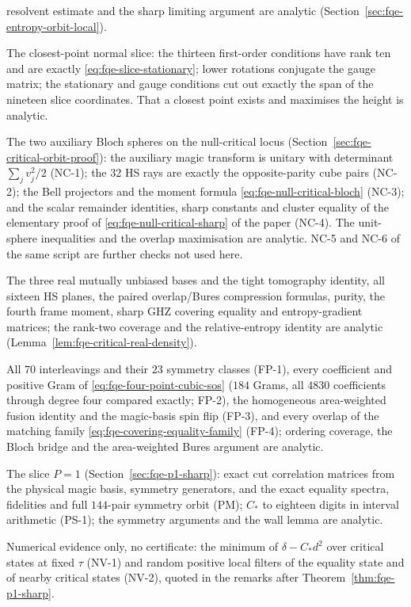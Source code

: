 \begin{description}
resolvent estimate and the sharp limiting argument are analytic
(Section~\ref{sec:fqe-entropy-orbit-local}).
\item[NSL-1--NSL-3] The closest-point normal slice: the thirteen first-order conditions have rank ten and are
exactly \eqref{eq:fqe-slice-stationary}; lower rotations conjugate the gauge matrix; the stationary and gauge
conditions cut out exactly the span of the nineteen slice coordinates. That a closest point exists and
maximises the height is analytic.
\item[NC-1--NC-4] The two auxiliary Bloch spheres on the null-critical locus
(Section~\ref{sec:fqe-critical-orbit-proof}): the auxiliary magic transform is unitary with determinant
$\sum_jv_j^2/2$ (NC-1); the 32 HS rays are exactly the opposite-parity cube pairs (NC-2); the Bell
projectors and the moment formula \eqref{eq:fqe-null-critical-bloch} (NC-3); and the scalar remainder
identities, sharp constants and cluster equality of the elementary proof of
\eqref{eq:fqe-null-critical-sharp} of the paper (NC-4). The unit-sphere inequalities and the overlap maximisation are
analytic. NC-5 and NC-6 of the same script are further checks not used here.

\item[RP-1--RP-4] The three real mutually unbiased bases and the tight tomography identity, all sixteen
HS planes, the paired overlap/Bures compression formulas, purity, the fourth frame moment, sharp GHZ
covering equality and entropy-gradient matrices; the rank-two coverage and the relative-entropy identity
are analytic (Lemma~\ref{lem:fqe-critical-real-density}).
\item[FP-1--FP-4] All $70$ interleavings and their $23$ symmetry classes (FP-1), every coefficient and positive
Gram of \eqref{eq:fqe-four-point-cubic-sos} ($184$ Grams, all $4830$ coefficients through degree four
compared exactly; FP-2), the homogeneous area-weighted fusion identity and the magic-basis spin flip (FP-3), and every
overlap of the matching family \eqref{eq:fqe-covering-equality-family} (FP-4); ordering coverage, the Bloch
bridge and the area-weighted Bures argument are analytic.
\item[PM-1, PM-2, PM-4, PS-1] The slice $P=1$ (Section~\ref{sec:fqe-p1-sharp}): exact cut correlation
matrices from the physical magic basis, symmetry generators, and the exact equality
spectra, fidelities and full $144$-pair symmetry orbit (PM); $C_*$ to eighteen digits in interval arithmetic (PS-1);
the symmetry arguments and the wall lemma are analytic.
\item[NV-1--NV-2] Numerical evidence only, no certificate: the minimum of $\delta-C_*d^2$ over critical states at fixed
$\tau$ (NV-1) and random positive local filters of the equality state and of nearby critical states (NV-2), quoted in the
remarks after Theorem~\ref{thm:fqe-p1-sharp}.


\end{description}
